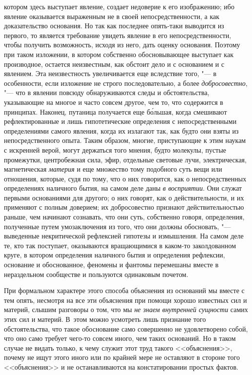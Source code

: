 котором здесь выступает явление, создает недоверие к его изображению; ибо
явление оказывается выраженным не в своей непосредственности, а как
доказательство основания. Но так как последнее опять-таки выводится из первого,
то является требование увидеть явление в его непосредственности, чтобы получить
возможность, исходя из него, дать оценку основания. Поэтому при таком
изложении, в котором собственно обосновывающее выступает как производное,
остается неизвестным, как обстоит дело и с основанием и с явлением. Эта
неизвестность увеличивается еще вследствие того, "--- в особенности, если
изложение не строго последовательно, а более {\em добросовестно}, "--- что в
явлении повсюду обнаруживаются следы и обстоятельства, указывающие на многое и
часто совсем другое, чем то, что содержится в принципах. Наконец, путаница
получается еще б\'{о}льшая, когда смешивают рефлектированные и лишь
гипотетические определения с непосредственными определениями самого явления,
когда их излагают так, как будто они взяты из непосредственного опыта. Таким
образом, многие, приступающие к этим наукам с искренней верой, могут держаться
того мнения, будто молекулы, пустые промежутки, центробежная сила, эфир,
отдельные световые лучи, электрическая, магнетическая {\em материя} и еще
множество тому подобного суть вещи или отношения, которые, судя по тому, что о
них говорится, как о непосредственных определениях наличного бытия, на самом
деле даны {\em в восприятии}. Они служат первыми основаниями для другого; о них
говорят, как о действительности, и их применяют с полным доверием; их
добросовестно признают действительностью раньше, чем начинают сознавать, что
они суть, собственно говоря, определения, полученные путем умозаключения из
того, что они должны обосновать, "--- выведенные некритической рефлексией
гипотезы и измышления. На самом деле те, кто так поступает, оказываются
вращающимися в каком-то заколдованном круге, в котором определения наличного
бытия и определения рефлексии, основание и обоснованное, феномены и фантомы
перемешаны вместе в нераздельном сообществе и пользуются одинаковым почетом.

При формальном характере этого способа объяснения из оснований мы вместе с тем
опять, несмотря на все эти объяснения при помощи хорошо известных сил и
материй, слышим разговоры о том, что мы {\em не знаем внутренней сущности}
самих этих сил и материй. В~этом можно усмотреть лишь признание того
обстоятельства, что такое обоснование само совершенно не удовлетворено собой,
что оно само требует чего-то совсем иного, чем таких оснований. Но в таком
случае не видать только, к чему служит этот труд такого <<объяснения>>, почему
не ищут этого иного или по крайней мере не оставляют в стороне того
<<объяснения>> и не останавливаются на констатировании простых фактов.

